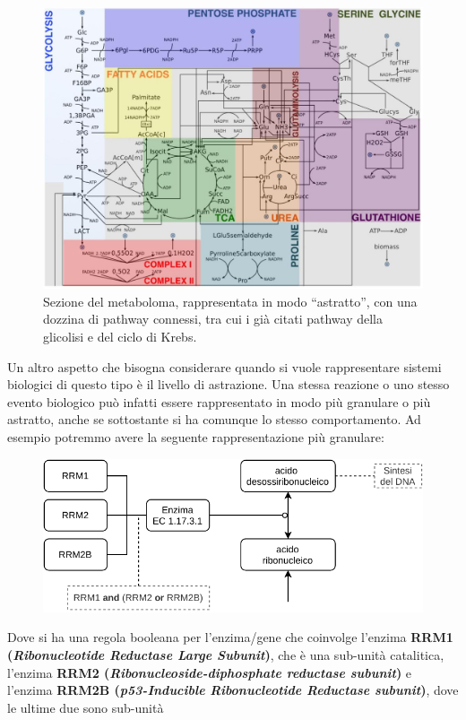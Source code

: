 \documentclass[a4paper,12pt, oneside]{book}
\begin{document}
\begin{figure}
  \centering
  \includegraphics[scale = 0.25]{img/met.jpg}
  \caption{Sezione del metaboloma, rappresentata in modo ``astratto'', con una
    dozzina di pathway connessi, tra cui i già citati pathway della glicolisi e
    del ciclo di Krebs.} 
  \label{fig:met}
\end{figure}
Un altro aspetto che bisogna considerare quando si vuole rappresentare sistemi
biologici di questo tipo è il livello di astrazione. Una stessa reazione o uno
stesso evento biologico può infatti essere rappresentato in modo più granulare o
più astratto, anche se sottostante si ha comunque lo stesso comportamento.
\newpage
Ad esempio potremmo avere la seguente rappresentazione più granulare:
\begin{figure}[H]
  \centering
  \includegraphics[scale = 0.8]{img/ab.pdf}
\end{figure}
Dove si ha una regola booleana per l'enzima/gene che coinvolge l'enzima
\textbf{RRM1 (\textit{Ribonucleotide Reductase Large Subunit})}, che è una
sub-unità catalitica, l'enzima \textbf{RRM2 (\textit{Ribonucleoside-diphosphate
    reductase subunit})} e l'enzima \textbf{RRM2B (\textit{p53-Inducible
    Ribonucleotide Reductase subunit})}, dove le ultime due sono sub-unità
\end{document}
